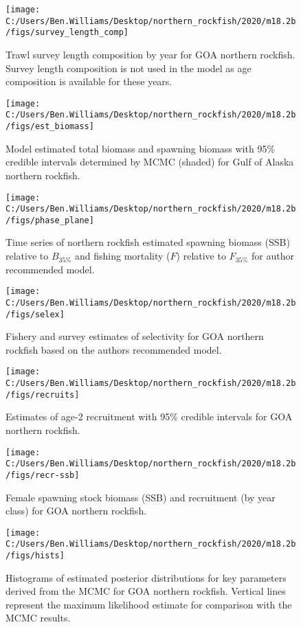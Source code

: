 \documentclass[
  11pt,
]{article}
\begin{document}
\begin{figure}
\texttt{[image: C:/Users/Ben.Williams/Desktop/northern\_rockfish/2020/m18.2b/figs/survey\_length\_comp]} \caption{Trawl survey length composition by year for GOA northern rockfish. Survey length composition is not used in the model as age composition is available for these years.}\label{fig:fig7}
\end{figure}

\begin{figure}
\texttt{[image: C:/Users/Ben.Williams/Desktop/northern\_rockfish/2020/m18.2b/figs/est\_biomass]} \caption{Model estimated total biomass and spawning biomass with 95\% credible intervals determined by MCMC (shaded) for Gulf of Alaska northern rockfish.}\label{fig:fig9}
\end{figure}

\begin{figure}
\texttt{[image: C:/Users/Ben.Williams/Desktop/northern\_rockfish/2020/m18.2b/figs/phase\_plane]} \caption{Time series of northern rockfish estimated spawning biomass (SSB) relative to $B_{35\%}$ and fishing mortality ($F$) relative to $F_{35\%}$ for author recommended model.}\label{fig:fig10}
\end{figure}

\begin{figure}
\texttt{[image: C:/Users/Ben.Williams/Desktop/northern\_rockfish/2020/m18.2b/figs/selex]} \caption{Fishery and survey estimates of selectivity for GOA northern rockfish based on the authors recommended model.}\label{fig:fig11}
\end{figure}

\begin{figure}
\texttt{[image: C:/Users/Ben.Williams/Desktop/northern\_rockfish/2020/m18.2b/figs/recruits]} \caption{Estimates of age-2 recruitment with 95\% credible intervals for GOA northern rockfish.}\label{fig:fig12}
\end{figure}

\begin{figure}
\texttt{[image: C:/Users/Ben.Williams/Desktop/northern\_rockfish/2020/m18.2b/figs/recr-ssb]} \caption{Female spawning stock biomass (SSB) and recruitment (by year class) for GOA northern rockfish.}\label{fig:fig13}
\end{figure}

\begin{figure}
\texttt{[image: C:/Users/Ben.Williams/Desktop/northern\_rockfish/2020/m18.2b/figs/hists]} \caption{Histograms of estimated posterior distributions for key parameters derived from the MCMC for GOA northern rockfish. Vertical lines represent the maximum likelihood estimate for comparison with the MCMC results.}\label{fig:fig14}
\end{figure}
\end{document}
